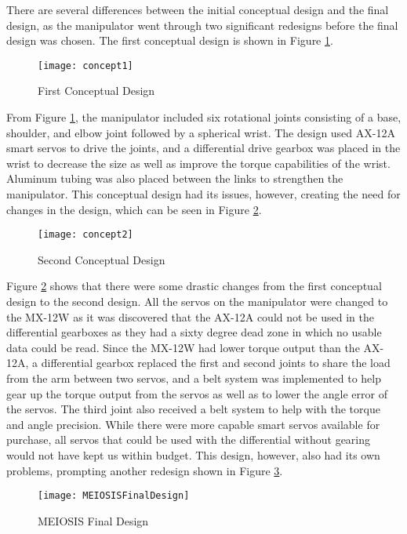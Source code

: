 There are several differences between the initial conceptual design and the final design, as the manipulator went through two significant redesigns before the final design was chosen. The first conceptual design is shown in Figure \ref{fig:concept1}.
\begin{figure}[htp]
  \centering
  \texttt{[image: concept1]}
  \caption{First Conceptual Design}
  \label{fig:concept1}
\end{figure}
From Figure \ref{fig:concept1}, the manipulator included six rotational joints consisting of a base, shoulder, and elbow joint followed by a spherical wrist. The design used AX-12A smart servos to drive the joints, and a differential drive gearbox was placed in the wrist to decrease the size as well as improve the torque capabilities of the wrist. Aluminum tubing was also placed between the links to strengthen the manipulator. This conceptual design had its issues, however, creating the need for changes in the design, which can be seen in Figure \ref{fig:concept2}.
\begin{figure}[htp]
  \centering
  \texttt{[image: concept2]}
  \caption{Second Conceptual Design}
  \label{fig:concept2}
\end{figure}
Figure \ref{fig:concept2} shows that there were some drastic changes from the first conceptual design to the second design. All the servos on the manipulator were changed to the MX-12W as it was discovered that the AX-12A could not be used in the differential gearboxes as they had a sixty degree dead zone in which no usable data could be read. Since the MX-12W had lower torque output than the AX-12A, a differential gearbox replaced the first and second joints to share the load from the arm between two servos, and a belt system was implemented to help gear up the torque output from the servos as well as to lower the angle error of the servos. The third joint also received a belt system to help with the torque and angle precision. While there were more capable smart servos available for purchase, all servos that could be used with the differential without gearing would not have kept us within budget. This design, however, also had its own problems, prompting another redesign shown in Figure \ref{fig:MEIOSISFinalDesign}.
\begin{figure}[htp]
  \centering
  \texttt{[image: MEIOSISFinalDesign]}
  \caption{MEIOSIS Final Design}
  \label{fig:MEIOSISFinalDesign}
\end{figure}
